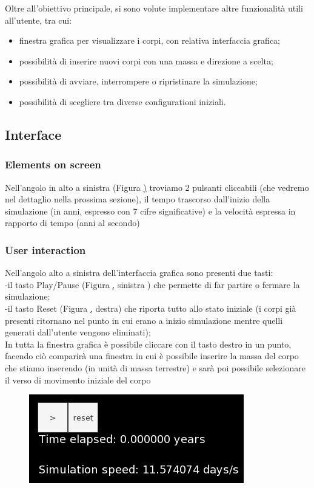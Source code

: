 \documentclass{article}
\begin{document}
Oltre all'obiettivo principale, si sono volute implementare altre funzionalità utili all'utente, tra cui:
\begin{itemize}
    \item finestra grafica per visualizzare i corpi, con relativa interfaccia grafica;
    \item possibilità di inserire nuovi corpi con una massa e direzione a scelta;
    \item possibilità di avviare, interrompere o ripristinare la simulazione;
    \item possibilità di scegliere tra diverse configurationi iniziali.
\end{itemize}

\subsection{Interface}
\subsubsection{Elements on screen}
Nell'angolo in alto a sinistra (Figura \href{playpause} ) troviamo 2 pulsanti cliccabili (che vedremo nel dettaglio nella prossima sezione),
il tempo trascorso dall'inizio della simulazione (in anni, espresso con 7 cifre significative) e la velocità espressa in rapporto di tempo (anni al secondo)

\subsubsection{User interaction}
Nell'angolo alto a sinistra dell'interfaccia grafica sono presenti due tasti: \\
-il tasto Play/Pause (Figura \href{playpause}, sinistra ) che permette di far partire o fermare la simulazione;\\
-il tasto Reset (Figura \href{playpause}, destra) che riporta tutto allo stato iniziale (i corpi già presenti ritornano nel punto in cui erano a inizio simulazione mentre quelli generati dall'utente vengono eliminati); \\
In tutta la finestra grafica è possibile cliccare con il tasto destro in un punto, facendo ciò comparirà una finestra in cui è possibile inserire la massa del corpo che stiamo inserendo (in unità di massa terrestre) e sarà poi possibile selezionare il verso di movimento iniziale del corpo

\begin{figure} [H]
    \centering
    \includegraphics[height=.20\linewidth]{Playpause.png}
    \label{playpause}
\end{figure}
\end{document}
